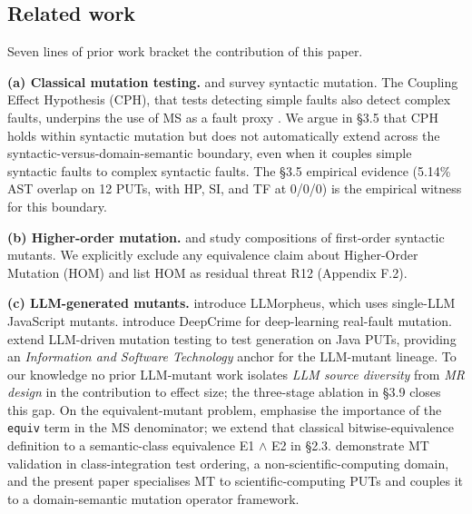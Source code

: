 \documentclass[acmsmall,screen,review]{acmart}
\begin{document}
\subsection{Related work}\label{related-work-and-roadmap}

Seven lines of prior work bracket the contribution of this paper.

\textbf{(a) Classical mutation testing.} \citet{d7c38286734419b52de4262c9802ebdfcf4b9447} and
\citet{d461ab9482b7fb5eadd7e6cd2c6dffced8ede8b8} survey syntactic mutation. The Coupling Effect
Hypothesis (CPH), that tests detecting simple faults also detect complex
faults, underpins the use of MS as a fault proxy \citep{91b1f655c6e42c02eed722b213e3c03df2e2d75a,andrews2005mutation,just2014mutants}. We
argue in §3.5 that CPH holds within syntactic mutation but does not
automatically extend across the syntactic-versus-domain-semantic
boundary, even when it couples simple syntactic faults to complex
syntactic faults. The §3.5 empirical evidence (5.14\% AST overlap on 12
PUTs, with HP, SI, and TF at 0/0/0) is the empirical witness for this
boundary.

\textbf{(b) Higher-order mutation.} \citet{c03829bdd1a6e45113092384bf0fa05a064ca54a} and \citet{kintis2018effective}
study compositions of first-order syntactic mutants. We
explicitly exclude any equivalence claim about Higher-Order Mutation
(HOM) and list HOM as residual threat R12 (Appendix F.2).

\textbf{(c) LLM-generated mutants.} \citet{tip2025llmorpheus}
introduce LLMorpheus, which uses single-LLM JavaScript mutants.
\citet{humbatova2021deepcrime} introduce DeepCrime for
deep-learning real-fault mutation. \citet{dakhel2024llm} extend
LLM-driven mutation testing to test generation on Java PUTs, providing
an \emph{Information and Software Technology} anchor for the LLM-mutant
lineage. To our knowledge no prior LLM-mutant work isolates \emph{LLM
source diversity} from \emph{MR design} in the contribution to effect
size; the three-stage ablation in §3.9 closes this gap. On the
equivalent-mutant problem, \citet{delgadoperez2020equivalent} emphasise
the importance of the \texttt{equiv} term in the MS denominator; we
extend that classical bitwise-equivalence definition to a semantic-class
equivalence E1 $\wedge$ E2 in §2.3. \citet{zhang2021classintegration} demonstrate MT
validation in class-integration test ordering, a
non-scientific-computing domain, and the present paper specialises MT to
scientific-computing PUTs and couples it to a domain-semantic mutation
operator framework.
\end{document}
